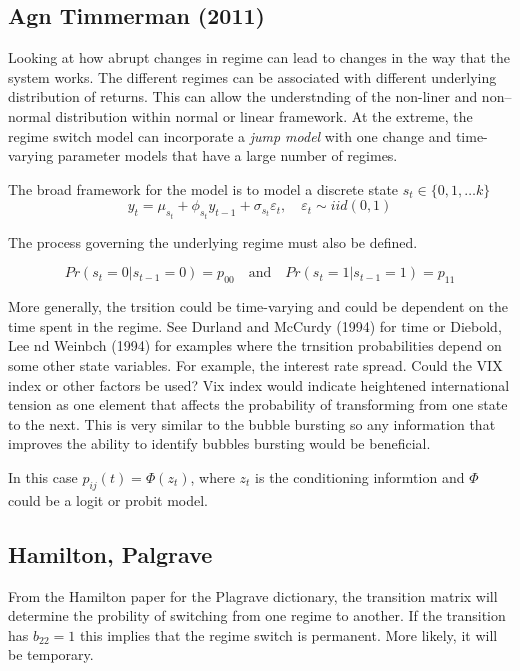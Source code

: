 \documentclass[12pt, a4paper, oneside]{article} %
\begin{document}
\subsection{Agn Timmerman (2011)}
Looking at how abrupt changes in regime can lead to changes in the way that the system works.  The different regimes can be associated with different underlying distribution of returns.  This can allow the understnding of the non-liner and non--normal distribution within  normal or linear framework.  At the extreme, the regime switch model can incorporate a \emph{jump model} with one change and time-varying parameter models that have a large number of regimes.

The broad framework for the model is to model a discrete state $s_t \in \{0,1,\dots k \}$
\begin{equation}
y_t = \mu_{s_t} + \phi_{s_t} y_{t-1} + \sigma_{s_t} \varepsilon_t, \quad \varepsilon_t \sim iid(0,1) 
\end{equation}

The process governing the underlying regime must also be defined. 

\begin{equation}
Pr(s_t = 0| s_{t-1} = 0) = p_{00} \quad \text{and} \quad Pr(s_t = 1| s_{t-1} = 1) = p_{11}
\end{equation}

More generally, the trsition could be time-varying and could be dependent on the time spent in the regime.  See Durland and McCurdy (1994) for time or Diebold, Lee nd Weinbch (1994) for examples where the trnsition probabilities depend on some other state variables.  For example, the interest rate spread.   Could the VIX index or other factors be used?  Vix index would indicate heightened international tension as one element that affects the probability of transforming from one state to the next.  This is very similar to the bubble bursting so any information that improves the ability to identify bubbles bursting would be beneficial.  

In this case $p_{ij}(t) = \Phi(z_t)$, where $z_t$ is the conditioning informtion and $\Phi$ could be a logit or probit model.  



\subsection{Hamilton, Palgrave}
From the Hamilton paper for the Plagrave dictionary, the transition matrix will determine the probility of switching from one regime to another.  If the transition has $b_{22} = 1$ this implies that the regime switch is permanent. More likely, it will be temporary. 
 
\end{document}
